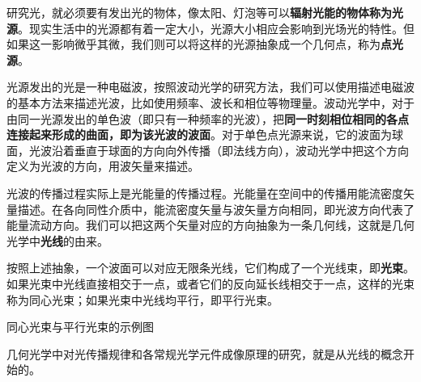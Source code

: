 
研究光，就必须要有发出光的物体，像太阳、灯泡等可以\textbf{辐射光能的物体称为光源}。现实生活中的光源都有着一定大小，光源大小相应会影响到光场光的特性。但如果这一影响微乎其微，我们则可以将这样的光源抽象成一个几何点，称为\textbf{点光源}。

光源发出的光是一种电磁波，按照波动光学的研究方法，我们可以使用描述电磁波的基本方法来描述光波，比如使用频率、波长和相位等物理量。波动光学中，对于由同一光源发出的单色波（即只有一种频率的光波），把\textbf{同一时刻相位相同的各点连接起来形成的曲面，即为该光波的波面}。对于单色点光源来说，它的波面为球面，光波沿着垂直于球面的方向向外传播（即法线方向），波动光学中把这个方向定义为光波的方向，用波矢量来描述。

光波的传播过程实际上是光能量的传播过程。光能量在空间中的传播用能流密度矢量描述。在各向同性介质中，能流密度矢量与波矢量方向相同，即光波方向代表了能量流动方向。我们可以把这两个矢量对应的方向抽象为一条几何线，这就是几何光学中\textbf{光线}的由来。

按照上述抽象，一个波面可以对应无限条光线，它们构成了一个光线束，即\textbf{光束}。如果光束中光线直接相交于一点，或者它们的反向延长线相交于一点，这样的光束称为同心光束；如果光束中光线均平行，即平行光束。

\begin{issues}
\issueTODO 同心光束与平行光束的示例图
\end{issues}

几何光学中对光传播规律和各常规光学元件成像原理的研究，就是从光线的概念开始的。
